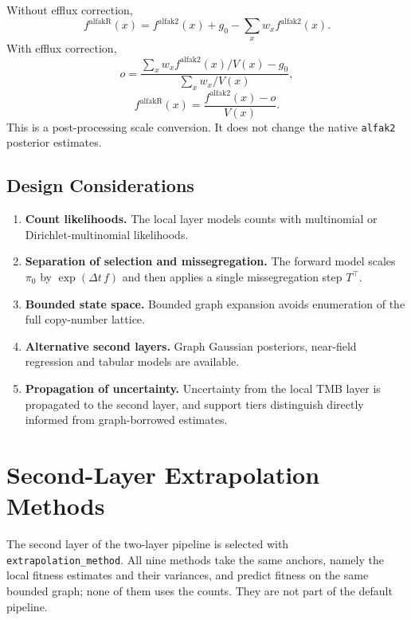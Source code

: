 \documentclass[11pt]{article}
\begin{document}
Without efflux correction,
\[
  f^{\mathrm{alfakR}}(x)
  =
  f^{\mathrm{alfak2}}(x)
  +
  g_0
  -
  \sum_x w_x f^{\mathrm{alfak2}}(x).
\]
With efflux correction,
\[
  o
  =
  \frac{
    \sum_x w_x f^{\mathrm{alfak2}}(x)/V(x)-g_0
  }{
    \sum_x w_x/V(x)
  },
\]
\[
  f^{\mathrm{alfakR}}(x)
  =
  \frac{f^{\mathrm{alfak2}}(x)-o}{V(x)}.
\]
This is a post-processing scale conversion. It does not change the native
\texttt{alfak2} posterior estimates.

\subsection{Design Considerations}

\begin{enumerate}
  \item \textbf{Count likelihoods.} The local layer models counts with
  multinomial or Dirichlet-multinomial likelihoods.
  \item \textbf{Separation of selection and missegregation.} The forward model
  scales $\pi_0$ by $\exp(\Delta t\,f)$ and then applies a single
  missegregation step $T^\top$.
  \item \textbf{Bounded state space.} Bounded graph expansion avoids
  enumeration of the full copy-number lattice.
  \item \textbf{Alternative second layers.} Graph Gaussian posteriors,
  near-field regression and tabular models are available.
  \item \textbf{Propagation of uncertainty.} Uncertainty from the local TMB
  layer is propagated to the second layer, and support tiers distinguish
  directly informed from graph-borrowed estimates.
\end{enumerate}

\section{Second-Layer Extrapolation Methods}
\label{sec:s-extrapolation}

The second layer of the two-layer pipeline is selected with
\texttt{extrapolation\_method}. All nine methods take the same anchors, namely
the local fitness estimates and their variances, and predict fitness on the
same bounded graph; none of them uses the counts. They are not part of the
default pipeline.
\end{document}
